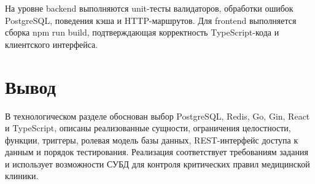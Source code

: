 На уровне backend выполняются unit-тесты валидаторов, обработки ошибок PostgreSQL, поведения кэша и HTTP-маршрутов. Для frontend выполняется сборка npm run build, подтверждающая корректность TypeScript-кода и клиентского интерфейса.

\section{Вывод}

В технологическом разделе обоснован выбор PostgreSQL, Redis, Go, Gin, React и TypeScript, описаны реализованные сущности, ограничения целостности, функции, триггеры, ролевая модель базы данных, REST-интерфейс доступа к данным и порядок тестирования. Реализация соответствует требованиям задания и использует возможности СУБД для контроля критических правил медицинской клиники.

\clearpage
